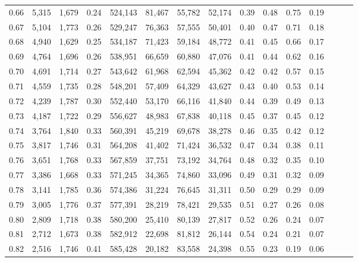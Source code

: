 \begin{tabular}{rrrrrrrrrrrrrrr}
0.66 &  5,315 &  1,679 &  0.24 &  524,143 &   81,467 &   55,782 &   52,174 &  0.39 &  0.48 &  0.75 &      0.19 \\
0.67 &  5,104 &  1,773 &  0.26 &  529,247 &   76,363 &   57,555 &   50,401 &  0.40 &  0.47 &  0.71 &      0.18 \\
0.68 &  4,940 &  1,629 &  0.25 &  534,187 &   71,423 &   59,184 &   48,772 &  0.41 &  0.45 &  0.66 &      0.17 \\
0.69 &  4,764 &  1,696 &  0.26 &  538,951 &   66,659 &   60,880 &   47,076 &  0.41 &  0.44 &  0.62 &      0.16 \\
0.70 &  4,691 &  1,714 &  0.27 &  543,642 &   61,968 &   62,594 &   45,362 &  0.42 &  0.42 &  0.57 &      0.15 \\
0.71 &  4,559 &  1,735 &  0.28 &  548,201 &   57,409 &   64,329 &   43,627 &  0.43 &  0.40 &  0.53 &      0.14 \\
0.72 &  4,239 &  1,787 &  0.30 &  552,440 &   53,170 &   66,116 &   41,840 &  0.44 &  0.39 &  0.49 &      0.13 \\
0.73 &  4,187 &  1,722 &  0.29 &  556,627 &   48,983 &   67,838 &   40,118 &  0.45 &  0.37 &  0.45 &      0.12 \\
0.74 &  3,764 &  1,840 &  0.33 &  560,391 &   45,219 &   69,678 &   38,278 &  0.46 &  0.35 &  0.42 &      0.12 \\
0.75 &  3,817 &  1,746 &  0.31 &  564,208 &   41,402 &   71,424 &   36,532 &  0.47 &  0.34 &  0.38 &      0.11 \\
0.76 &  3,651 &  1,768 &  0.33 &  567,859 &   37,751 &   73,192 &   34,764 &  0.48 &  0.32 &  0.35 &      0.10 \\
0.77 &  3,386 &  1,668 &  0.33 &  571,245 &   34,365 &   74,860 &   33,096 &  0.49 &  0.31 &  0.32 &      0.09 \\
0.78 &  3,141 &  1,785 &  0.36 &  574,386 &   31,224 &   76,645 &   31,311 &  0.50 &  0.29 &  0.29 &      0.09 \\
0.79 &  3,005 &  1,776 &  0.37 &  577,391 &   28,219 &   78,421 &   29,535 &  0.51 &  0.27 &  0.26 &      0.08 \\
0.80 &  2,809 &  1,718 &  0.38 &  580,200 &   25,410 &   80,139 &   27,817 &  0.52 &  0.26 &  0.24 &      0.07 \\
0.81 &  2,712 &  1,673 &  0.38 &  582,912 &   22,698 &   81,812 &   26,144 &  0.54 &  0.24 &  0.21 &      0.07 \\
0.82 &  2,516 &  1,746 &  0.41 &  585,428 &   20,182 &   83,558 &   24,398 &  0.55 &  0.23 &  0.19 &      0.06 \\

\end{tabular}
